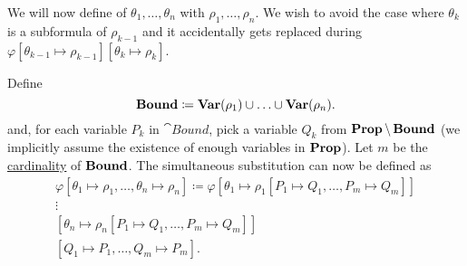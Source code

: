 \begin{definition}
\begin{thmenum}
     We will now define  of \( \theta_1, \ldots, \theta_n \) with \( \rho_1, \ldots, \rho_n \). We wish to avoid the case where \( \theta_k \) is a subformula of \( \rho_{k-1} \) and it accidentally gets replaced during \( \varphi[\theta_{k-1} \mapsto \rho_{k-1}][\theta_k \mapsto \rho_k] \).

    Define
    \begin{equation*}
      \operatorname{\mathbf{Bound}} \coloneqq \operatorname{\mathbf{Var}}(\rho_1) \cup \ldots \cup \operatorname{\mathbf{Var}}(\rho_n).
    \end{equation*}
    and, for each variable \( P_k \) in \( \cat{Bound} \), pick a variable \( Q_k \) from \( \operatorname{\mathbf{Prop}} \setminus \operatorname{\mathbf{Bound}} \) (we implicitly assume the existence of enough variables in \( \operatorname{\mathbf{Prop}} \)). Let \( m \) be the \hyperref[def:cardinal]{cardinality} of \( \operatorname{\mathbf{Bound}} \). The simultaneous substitution can now be defined as
    \begin{align*}
      \varphi[\theta_1 \mapsto \rho_1, \ldots, \theta_n \mapsto \rho_n] \coloneqq \varphi
      [\theta_1 \mapsto \rho_1[P_1 \mapsto Q_1, \ldots, P_m \mapsto Q_m]] \\
      \vdots \hspace{3cm} \\
      [\theta_n \mapsto \rho_n[P_1 \mapsto Q_1, \ldots, P_m \mapsto Q_m]] \\
      [Q_1 \mapsto P_1, \ldots, Q_m \mapsto P_m].
    \end{align*}
  \end{thmenum}
\end{definition}

